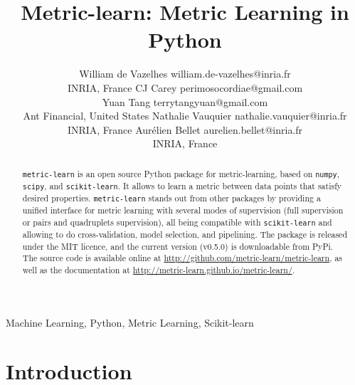 \documentclass[twoside,11pt]{article}
\begin{document}
\title{Metric-learn: Metric Learning in Python}

\author{\name William de Vazelhes \email william.de-vazelhes@inria.fr \\
       \addr INRIA, France
       \AND
       \name CJ Carey \email perimosocordiae@gmail.com \\
       \addr {}
       \AND
       \name Yuan Tang \email terrytangyuan@gmail.com \\
       \addr Ant Financial, United States
       \AND
       \name Nathalie Vauquier \email nathalie.vauquier@inria.fr \\
       \addr INRIA, France
       \AND
       \name Aur\'elien Bellet \email aurelien.bellet@inria.fr \\
       \addr INRIA, France
       }

\editor{}

\maketitle

\begin{abstract}%
\texttt{metric-learn} is an open source Python package for metric-learning, based on \texttt{numpy}, \texttt{scipy}, and \texttt{scikit-learn}. It allows to learn a metric between data points that satisfy desired properties. \texttt{metric-learn} stands out from other packages by providing a unified interface for metric learning with several modes of supervision (full supervision or pairs and quadruplets supervision), all being compatible with \texttt{scikit-learn} and allowing to do cross-validation, model selection, and pipelining. The package is released under the MIT licence, and the current version (v0.5.0) is downloadable from PyPi. The source code is available online at \url{http://github.com/metric-learn/metric-learn}, as well as the documentation at \url{http://metric-learn.github.io/metric-learn/}.
\end{abstract}




\begin{keywords}
  Machine Learning, Python, Metric Learning, Scikit-learn
\end{keywords}

\section{Introduction}
\end{document}

